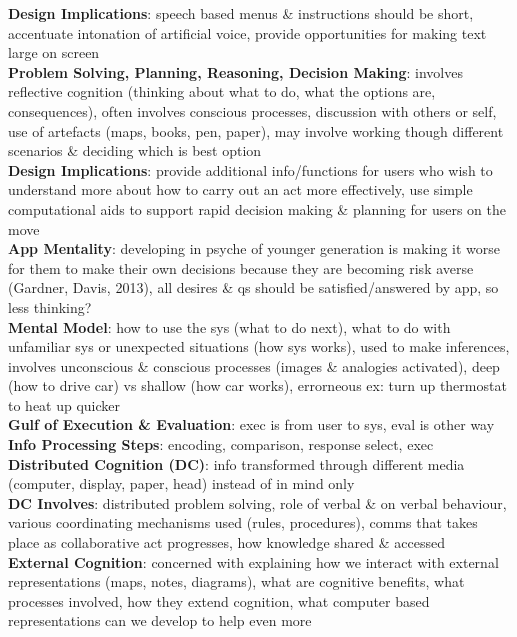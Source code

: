 \documentclass[a4paper]{article}
\begin{document}
\begin{multicols}{3}
        \textbf {Design Implications}: speech based menus \& instructions should be short, accentuate intonation of artificial voice, provide opportunities for making text large on screen\\
        \textbf{Problem Solving, Planning, Reasoning, Decision Making}: involves reflective cognition (thinking about what to do, what the options are, consequences), often involves conscious processes, discussion with others or self, use of artefacts (maps, books, pen, paper), may involve working though different scenarios \& deciding which is best option\\
        \textbf{Design Implications}: provide additional info/functions for users who wish to understand more about how to carry out an act more effectively, use simple computational aids to support rapid decision making \& planning for users on the move\\
        \textbf{App Mentality}: developing in psyche of younger generation is making it worse for them to make their own decisions because they are becoming risk averse (Gardner, Davis, 2013), all desires \& qs should be satisfied/answered by app, so less thinking?\\
        \textbf{Mental Model}: how to use the sys (what to do next), what to do with unfamiliar sys or unexpected situations (how sys works), used to make inferences, involves unconscious \& conscious processes (images \& analogies activated), deep (how to drive car) vs shallow (how car works), errorneous ex: turn up thermostat to heat up quicker\\
        \textbf{Gulf of Execution \& Evaluation}: exec is from user to sys, eval is other way\\
        \textbf{Info Processing Steps}: encoding, comparison, response select, exec\\
        \textbf{Distributed Cognition (DC)}: info transformed through different media (computer, display, paper, head) instead of in mind only\\
        \textbf{DC Involves}: distributed problem solving, role of verbal \& on verbal behaviour, various coordinating mechanisms used (rules, procedures), comms that takes place as collaborative act progresses, how knowledge shared \& accessed\\
        \textbf{External Cognition}: concerned with explaining how we interact with external representations (maps, notes, diagrams), what are cognitive benefits, what processes involved, how they extend cognition, what computer based representations can we develop to help even more\\

\end{multicols}
\end{document}
